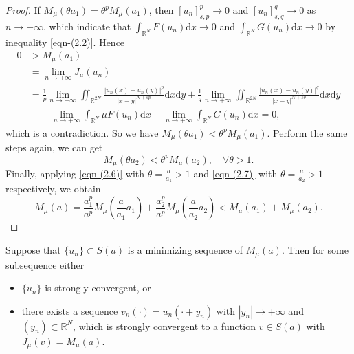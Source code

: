 \documentclass[reqno]{amsart}
\begin{document}
\begin{proof}
If $M_\mu(\theta a_1)={\theta}^{p}M_\mu(a_1)$, then $[u_n]_{s,p}^{p}\to 0$ and 
$[u_n]_{s,q}^{q}\to 0$ as $n\to +\infty$,
which indicate that $\int_{\mathbb{R}^N}F(u_n)\mathrm{d}x\to 0 $ and 
$\int_{\mathbb{R}^N}G(u_n)\mathrm{d}x\to 0 $ by inequality \eqref{eqn-(2.2)}. Hence
\begin{align*}
0&>M_\mu(a_1)\\
&= \lim\limits_{n\to +\infty}J_\mu(u_n)\\
&= \frac{1}{p}\lim\limits_{n\to +\infty}\iint_{\mathbb{R}^{2N}}\frac{|u_n(x)-u_n(y)|^{p}}{|x-y|^{N+sp}}\mathrm{d}x\mathrm{d}y+\frac{1}{q}\lim\limits_{n\to +\infty}\iint_{\mathbb{R}^{2N}}\frac{|u_n(x)-u_n(y)|^{q}}{|x-y|^{N+sq}}\mathrm{d}x\mathrm{d}y\\
&\quad -\lim\limits_{n\to +\infty}\int_{\mathbb{R}^N}\mu F(u_n)\mathrm{d}x
 -\lim\limits_{n\to +\infty}\int_{\mathbb{R}^N} G(u_n)\mathrm{d}x
= 0,
\end{align*}
which is a contradiction. So we have $M_\mu(\theta a_1)<{\theta}^{p}M_\mu(a_1)$.
Perform the same steps again, we can get
\begin{equation}\label{eqn-(2.7)}
M_\mu(\theta a_2)<{\theta}^{p}M_\mu(a_2),\quad\forall\theta>1.
\end{equation}
Finally, applying \eqref{eqn-(2.6)} with $\theta=\frac{a}{a_1}>1$ 
and \eqref{eqn-(2.7)} with $\theta=\frac{a}{a_2}>1$ respectively, we obtain
$$
M_\mu(a)=\frac{a_1^{p}}{a^{p}}M_\mu(\frac{a}{a_1}a_1)
+\frac{a_2^{p}}{a^{p}}M_\mu(\frac{a}{a_2}a_2)<M_\mu(a_1)+M_\mu(a_2).
$$
\end{proof}

\begin{lemma}\label{pro:2.1}
Suppose that $\{u_n\}\subset S(a)$ is a minimizing sequence of $M_\mu(a)$. 
Then  for some subsequence either
\begin{itemize}
\item[(i)] $\{u_n\}$ is strongly convergent,
or
\item[(ii)] there exists a sequence $v_n(\cdot)=u_n(\cdot+y_n)$ with 
$|y_n|\to+\infty$ and $(y_n)\subset\mathbb{R}^N$, which is strongly 
convergent to a function $v\in S(a)$ with $J_\mu(v)=M_\mu(a)$.
\end{itemize}
\end{lemma}
\end{document}
